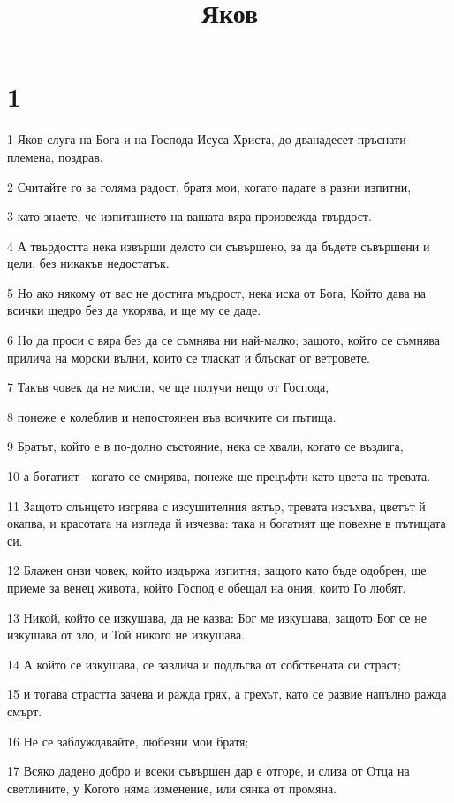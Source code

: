 

\title{Яков}


\chapter{1}

\par 1 Яков слуга на Бога и на Господа Исуса Христа, до дванадесет пръснати племена, поздрав.
\par 2 Считайте го за голяма радост, братя мои, когато падате в разни изпитни,
\par 3 като знаете, че изпитанието на вашата вяра произвежда твърдост.
\par 4 А твърдостта нека извърши делото си съвършено, за да бъдете съвършени и цели, без никакъв недостатък.
\par 5 Но ако някому от вас не достига мъдрост, нека иска от Бога, Който дава на всички щедро без да укорява, и ще му се даде.
\par 6 Но да проси с вяра без да се съмнява ни най-малко; защото, който се съмнява прилича на морски вълни, които се тласкат и блъскат от ветровете.
\par 7 Такъв човек да не мисли, че ще получи нещо от Господа,
\par 8 понеже е колеблив и непостоянен във всичките си пътища.
\par 9 Братът, който е в по-долно състояние, нека се хвали, когато се въздига,
\par 10 а богатият - когато се смирява, понеже ще прецъфти като цвета на тревата.
\par 11 Защото слънцето изгрява с изсушителния вятър, тревата изсъхва, цветът й окапва, и красотата на изгледа й изчезва: така и богатият ще повехне в пътищата си.
\par 12 Блажен онзи човек, който издържа изпитня; защото като бъде одобрен, ще приеме за венец живота, който Господ е обещал на ония, които Го любят.
\par 13 Никой, който се изкушава, да не казва: Бог ме изкушава, защото Бог се не изкушава от зло, и Той никого не изкушава.
\par 14 А който се изкушава, се завлича и подлъгва от собствената си страст;
\par 15 и тогава страстта зачева и ражда грях, а грехът, като се развие напълно ражда смърт.
\par 16 Не се заблуждавайте, любезни мои братя;
\par 17 Всяко дадено добро и всеки съвършен дар е отгоре, и слиза от Отца на светлините, у Когото няма изменение, или сянка от промяна.
